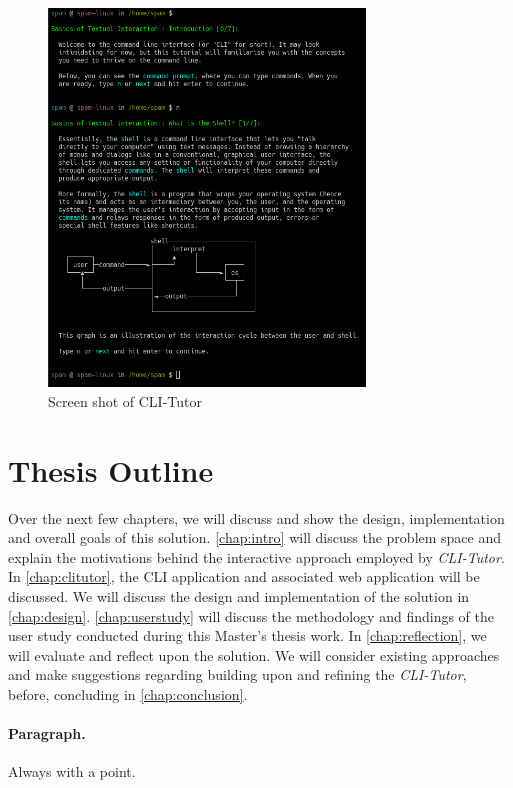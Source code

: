 \begin{figure}[htbp]
	\centering
	\includegraphics[width=0.75\textwidth]{img/clitutor}
	\caption{Screen shot of CLI-Tutor}
    \label{fig:clitutor}
\end{figure}

\section{Thesis Outline}

Over the next few chapters, we will discuss and show the design, implementation
and overall goals of this solution. \autoref{chap:intro} will discuss the
problem space and explain the motivations behind the interactive approach
employed by \textit{CLI-Tutor}. In \autoref{chap:clitutor}, the CLI application
and associated web application will be discussed. We will discuss the design
and implementation of the solution in \autoref{chap:design}.
\autoref{chap:userstudy} will discuss the methodology and findings of the user
study conducted during this Master's thesis work. In \autoref{chap:reflection},
we will evaluate and reflect upon the solution. We will consider existing
approaches and make suggestions regarding building upon and refining the
\textit{CLI-Tutor}, before, concluding in \autoref{chap:conclusion}.


\paragraph{Paragraph.} Always with a point. {}
